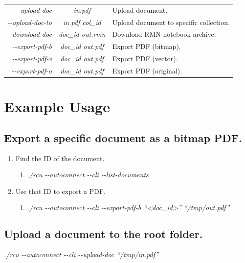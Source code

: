 \documentclass{memoir}
\begin{document}
{\begin{tabular}{ r | c | l }
\textit{\--\--upload-doc} & \textit{in.pdf} & Upload document. \\
\textit{\--\--upload-doc-to} & \textit{in.pdf \hspace{0.2cm} col\_id} & Upload document to specific collection. \\
\textit{\--\--download-doc} & \textit{doc\_id \hspace{0.2cm} out.rmn} & Download RMN notebook archive. \\
\textit{\--\--export-pdf-b} & \textit{doc\_id \hspace{0.2cm} out.pdf} & Export PDF (bitmap). \\
\textit{\--\--export-pdf-v} & \textit{doc\_id \hspace{0.2cm} out.pdf} & Export PDF (vector). \\
\textit{\--\--export-pdf-o} & \textit{doc\_id \hspace{0.2cm} out.pdf} & Export PDF (original). \\


\end{tabular}



\section{Example Usage}


\subsection{Export a specific document as a bitmap PDF.}
\begin{enumerate}
\item{Find the ID of the document.}
  \begin{enumerate}
  \item[]{\textit{./rcu \--\--autoconnect \--\--cli \--\--list-documents}}
  \end{enumerate}
\item{Use that ID to export a PDF.}
  \begin{enumerate}
  \item[]{\textit{./rcu \--\--autoconnect \--\--cli \--\--export-pdf-b ``<doc\_id>'' ``/tmp/out.pdf''}}
  \end{enumerate}
\end{enumerate}


\subsection{Upload a document to the root folder.}
\textit{./rcu \--\--autoconnect \--\--cli \--\--upload-doc ``/tmp/in.pdf''}


}
\end{document}
